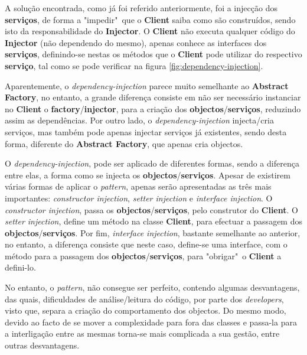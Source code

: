 A solução encontrada, como já foi referido anteriormente, foi a injecção dos \textbf{serviços}, de forma a "impedir"\ que o \textbf{Client} saiba como são construídos, sendo isto da responsabilidade do \textbf{Injector}. O \textbf{Client} não executa qualquer código do \textbf{Injector} (não dependendo do mesmo), apenas conhece as interfaces dos \textbf{serviços}, definindo-se nestas os métodos que o \textbf{Client} pode utilizar do respectivo \textbf{serviço}, tal como se pode verificar na figura \ref{fig:dependency-injection}.

Aparentemente, o \textit{dependency-injection} parece muito semelhante ao \textbf{Abstract Factory}, no entanto, a grande diferença consiste em não ser necessário instanciar no \textbf{Client} o \textbf{factory}/\textbf{injector}, para a criação dos \textbf{objectos}/\textbf{serviços}, reduzindo assim as dependências. Por outro lado, o \textit{dependency-injection} injecta/cria serviços, mas também pode apenas injectar serviços já existentes, sendo desta forma, diferente do \textbf{Abstract Factory}, que apenas cria objectos.

O \textit{dependency-injection}, pode ser aplicado de diferentes formas, sendo a diferença entre elas, a forma como se injecta os \textbf{objectos}/\textbf{serviços}. Apesar de existirem várias formas de aplicar o \textit{pattern}, apenas serão apresentadas as três mais importantes: \textit{constructor injection}, \textit{setter injection} e \textit{interface injection}. O \textit{constructor injection}, passa os \textbf{objectos}/\textbf{serviços}, pelo construtor do \textbf{Client}. O \textit{setter injection}, define um método na classe \textbf{Client}, para efectuar a passagem dos \textbf{objectos}/\textbf{serviços}. Por fim, \textit{interface injection}, bastante semelhante ao anterior, no entanto, a diferença consiste que neste caso, define-se uma interface, com o método para a passagem dos \textbf{objectos}/\textbf{serviços}, para "obrigar"\ o \textbf{Client} a defini-lo.

No entanto, o \textit{pattern}, não consegue ser perfeito, contendo algumas desvantagens, das quais, dificuldades de análise/leitura do código, por parte dos \textit{developers}, visto que, separa a criação do comportamento dos objectos. Do mesmo modo, devido ao facto de se mover a complexidade para fora das classes e passa-la para a interligação entre as mesmas torna-se mais complicada a sua gestão, entre outras desvantagens.

